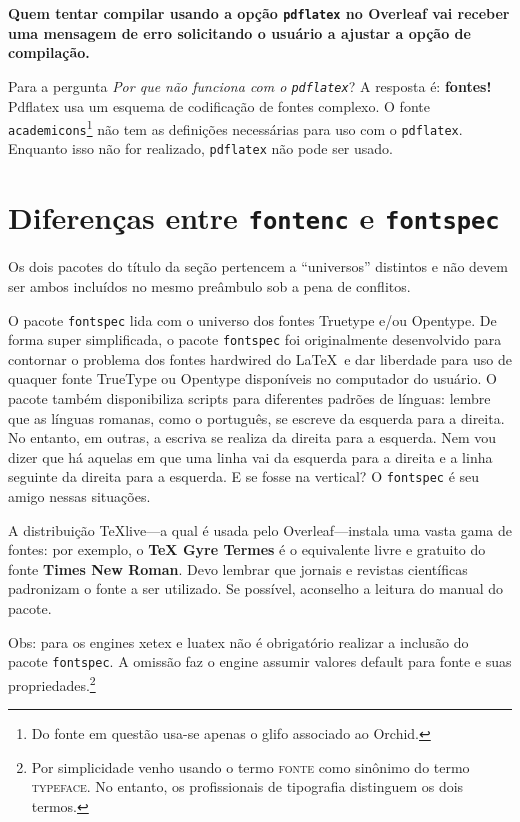 \documentclass[spanish]{sbc2025}%
\begin{document}
{\bfseries Quem tentar compilar usando a opção \texttt{pdflatex} no Overleaf vai receber uma mensagem de erro solicitando o usuário a ajustar a opção de compilação.}

Para a pergunta \textit{Por que não funciona com o \texttt{pdflatex}}?  A resposta é: \textbf{fontes!} Pdflatex usa um esquema de codificação de fontes complexo. 
O fonte \texttt{academicons}\footnote{Do fonte em questão usa-se apenas o glifo associado ao Orchid.} não tem as definições necessárias para uso com o \texttt{pdflatex}. Enquanto isso não for realizado, \texttt{pdflatex} não pode ser usado. 

\section{Diferenças entre \texttt{fontenc} e \texttt{fontspec}}

Os dois pacotes do título da seção pertencem a ``universos'' distintos e não devem ser ambos incluídos no mesmo preâmbulo sob a pena de conflitos.

O pacote \texttt{fontspec} lida com o universo dos fontes Truetype e/ou Opentype. De forma super simplificada, o pacote \texttt{fontspec} foi originalmente desenvolvido para contornar o problema dos fontes hardwired do \LaTeX\ e dar liberdade para uso de quaquer fonte TrueType ou Opentype  disponíveis no computador do usuário. O pacote também disponibiliza scripts para diferentes padrões de línguas: lembre que as línguas romanas, como o português, se escreve da esquerda para a direita. No entanto, em outras, a escriva se realiza da direita para a esquerda. Nem vou dizer que há aquelas em que uma linha vai da esquerda para a direita e a linha seguinte da direita para a esquerda. E se fosse na vertical? O \texttt{fontspec} é seu amigo nessas situações.

A distribuição TeXlive---a qual é usada pelo Overleaf---instala uma vasta gama de fontes: por exemplo, o \textbf{TeX Gyre Termes} é o equivalente livre e gratuito do fonte \textbf{Times New Roman}. Devo lembrar que jornais e revistas científicas padronizam o fonte a ser utilizado. Se possível, aconselho a leitura do manual do pacote.  

Obs: para os engines xetex e luatex não é obrigatório realizar a inclusão do pacote \texttt{fontspec}. A omissão faz o engine assumir valores default para fonte e suas propriedades.\footnote{Por simplicidade venho usando o termo \textsc{fonte} como sinônimo do termo \textsc{typeface}. No entanto, os profissionais de tipografia distinguem os dois termos.}
\end{document}
